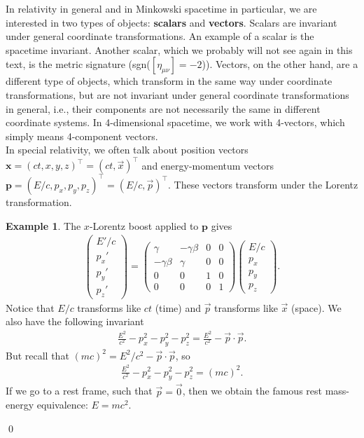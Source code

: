 \documentclass{book}
\theoremstyle{definition}
\newtheorem{exmp}{Example}[section]
\newcommand{\p}{\partial}
\begin{document}
In relativity in general and in Minkowski spacetime in particular, we are interested in two types of objects: \textbf{scalars} and \textbf{vectors}. Scalars are invariant under general coordinate transformations. An example of a scalar is the spacetime invariant. Another scalar, which we probably will not see again in this text, is the metric signature (sgn($[\eta_{\mu\nu}] = -2$)). Vectors, on the other hand, are a different type of objects, which transform in the same way under coordinate transformations, but are not invariant under general coordinate transformations in general, i.e., their components are not necessarily the same in different coordinate systems. In 4-dimensional spacetime, we work with 4-vectors, which simply means 4-component vectors.\\

In special relativity, we often talk about position vectors $\mathbf{x} = (ct,x,y,z)^\top = (ct,\vec{x})^\top$ and energy-momentum vectors $\mathbf{p} = (E/c,p_x,p_y,p_z)^\top = (E/c, \vec{p})^\top$. These vectors transform under the Lorentz transformation. 
\begin{exmp}
The $x$-Lorentz boost applied to $\mathbf{p}$ gives
\begin{align*}
\begin{pmatrix}
E'/c\\p_x'\\p_y'\\p_z'
\end{pmatrix}
=
\begin{pmatrix}
\gamma & -\gamma\beta & 0 & 0\\
-\gamma\beta & \gamma & 0 & 0\\
0 & 0 & 1 & 0\\
0 & 0 & 0 & 1
\end{pmatrix}
\begin{pmatrix}
E/c\\p_x\\p_y\\p_z
\end{pmatrix}.
\end{align*}
Notice that $E/c$ transforms like $ct$ (time) and $\vec{p}$ transforms like $\vec{x}$ (space). We also have the following invariant
\begin{align*}
\frac{E^2}{c^2} - p^2_x - p^2_y - p^2_z = \frac{E^2}{c^2} - \vec{p}\cdot\vec{p}.
\end{align*}
But recall that $(mc)^2 = E^2/c^2 - \vec{p}\cdot\vec{p}$, so
\begin{align*}
\frac{E^2}{c^2} - p^2_x - p^2_y - p^2_z = (mc)^2.
\end{align*} 
If we go to a rest frame, such that $\vec{p} = \vec{0}$, then we obtain the famous rest mass-energy equivalence: $E = mc^2$.
\end{exmp}\qed
\end{document}
